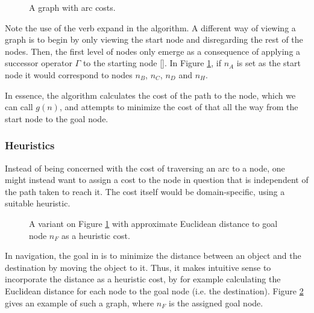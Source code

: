 \begin{figure}[h]
		\centering
		
		\caption{A graph with arc costs.}
		\label{fig:admis_ex}
\end{figure}



Note the use of the verb expand in the algorithm. A different way of viewing a graph is to begin by only viewing the start node and disregarding the rest of the nodes. Then, the first level of nodes only emerge as a consequence of applying a successor operator $\Gamma$ to the starting node [\citeauthor{PeterE.HAR}]. In Figure \ref{fig:admis_ex}, if $n_A$ is set as the start node it would correspond to nodes $n_B$, $n_C$, $n_D$ and $n_H$.

In essence, the algorithm calculates the cost of the path to the node, which we can call $g(n)$, and attempts to minimize the cost of that all the way from the start node to the goal node.




%	

\subsubsection*{Heuristics}

Instead of being concerned with the cost of traversing an arc to a node, one might instead want to assign a cost to the node in question that is independent of the path taken to reach it. The cost itself would be domain-specific, using a suitable heuristic. 

\begin{figure}[h]
	\centering
	
	\caption{A variant on Figure \ref{fig:admis_ex} with approximate Euclidean distance to goal node $n_F$ as a heuristic cost.}
	\label{fig:heur_ex}
\end{figure}


In navigation, the goal in is to minimize the distance between an object and the destination by moving the object to it. Thus, it makes intuitive sense to incorporate the distance as a heuristic cost, by for example calculating the Euclidean distance for each node to the goal node (i.e. the destination). Figure \ref{fig:heur_ex} gives an example of such a graph, where $n_F$ is the assigned goal node.


